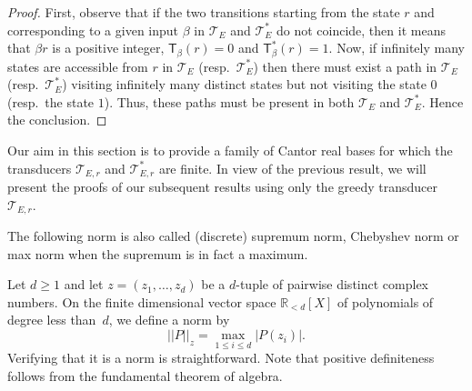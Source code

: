\documentclass[12pt,reqno]{amsart}
\begin{document}
\begin{proof}
    First, observe that if the two transitions starting from the state $r$ and corresponding to a given input $\beta$ in $\mathcal{T}_E$ and $\mathcal{T}^*_E$ do not coincide, then it means that $\beta r$ is a positive integer, $\mathsf{T}_{\beta}(r)=0$ and $\mathsf{T}^*_{\beta}(r)=1$. %
   Now, if infinitely many states are accessible from $r$ in  $\mathcal{T}_E$ (resp.\ $\mathcal{T}^*_E$) then there must exist a path in $\mathcal{T}_E$ (resp.\ $\mathcal{T}^*_E$) visiting infinitely many distinct states but not visiting the state $0$ (resp.\ the state $1$). Thus, these paths must be present in both $\mathcal{T}_E$ and $\mathcal{T}^*_E$. Hence the conclusion.
\end{proof}

Our aim in this section is to provide a family of Cantor real bases for which the transducers $\mathcal{T}_{E,r}$ and $\mathcal{T}^*_{E,r}$ are finite. In view of the previous result, we will present the proofs of our subsequent results using only the greedy transducer $\mathcal{T}_{E,r}$. 

The following norm is also called (discrete) supremum norm, Chebyshev norm or max norm when the supremum is in fact a maximum. 

\begin{definition}
\label{def:norm}
Let $d\ge 1$ and let $z=(z_1,\ldots,z_d)$ be a $d$-tuple of pairwise distinct complex numbers.
On the finite dimensional vector space $\mathbb{R}_{<d}[X]$ of polynomials of degree less than~$d$, we define a norm by 
\[\lvert \lvert P\rvert \rvert _{z}=\max_{1\le i\le d}|P(z_i)|.\]
Verifying that it is a norm is straightforward. Note that positive definiteness follows from the fundamental theorem of algebra.
\end{definition}
\end{document}
